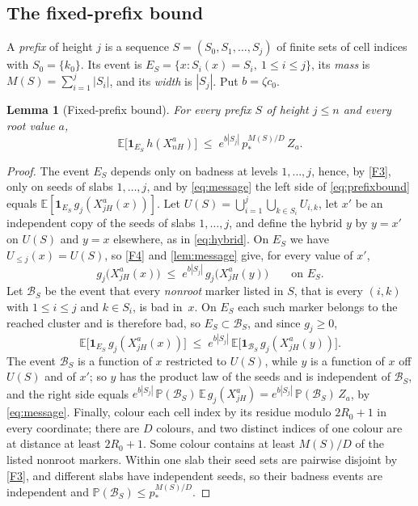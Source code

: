 \documentclass[11pt]{article}
\theoremstyle{plain}
\newtheorem{lemma}[theorem]{Lemma}
\theoremstyle{definition}
\theoremstyle{remark}
\newcommand{\E}{\mathbb{E}}
\newcommand{\Prob}{\mathbb{P}}
\begin{document}
\subsection{The fixed-prefix bound}

A \emph{prefix} of height $j$ is a sequence $S=(S_0,S_1,\dots,S_j)$ of finite sets of cell indices with $S_0=\{k_0\}$. Its event is $E_S=\{x:S_i(x)=S_i,\ 1\le i\le j\}$, its \emph{mass} is $M(S)=\sum_{i=1}^j|S_i|$, and its \emph{width} is $|S_j|$. Put $b=\zeta c_0$.

\begin{lemma}[Fixed-prefix bound]
\label{lem:prefix}
For every prefix $S$ of height $j\le n$ and every root value $a$,
\begin{equation}
\E\bigl[\mathbf 1_{E_S}\,h(X^a_{nH})\bigr]\;\le\;e^{b|S_j|}\,p_*^{M(S)/D}\,Z_a.
\label{eq:prefixbound}
\end{equation}
\end{lemma}

\begin{proof}
The event $E_S$ depends only on badness at levels $1,\dots,j$, hence, by \ref{F3}, only on seeds of slabs $1,\dots,j$, and by \eqref{eq:message} the left side of \eqref{eq:prefixbound} equals $\E[\mathbf 1_{E_S}\,g_j(X^a_{jH}(x))]$. Let $U(S)=\bigcup_{i=1}^j\bigcup_{k\in S_i}U_{i,k}$, let $x'$ be an independent copy of the seeds of slabs $1,\dots,j$, and define the hybrid $y$ by $y=x'$ on $U(S)$ and $y=x$ elsewhere, as in \eqref{eq:hybrid}. On $E_S$ we have $U_{\le j}(x)=U(S)$, so \ref{F4} and \cref{lem:message} give, for every value of $x'$,
\[
g_j\bigl(X^a_{jH}(x)\bigr)\;\le\;e^{b|S_j|}\,g_j\bigl(X^a_{jH}(y)\bigr)\qquad\text{on }E_S.
\]
Let $\mathcal B_S$ be the event that every \emph{nonroot} marker listed in $S$, that is every $(i,k)$ with $1\le i\le j$ and $k\in S_i$, is bad in~$x$. On $E_S$ each such marker belongs to the reached cluster and is therefore bad, so $E_S\subset\mathcal B_S$, and since $g_j\ge0$,
\[
\E\bigl[\mathbf 1_{E_S}\,g_j(X^a_{jH}(x))\bigr]\;\le\;e^{b|S_j|}\,\E\bigl[\mathbf 1_{\mathcal B_S}\,g_j(X^a_{jH}(y))\bigr].
\]
The event $\mathcal B_S$ is a function of $x$ restricted to $U(S)$, while $y$ is a function of $x$ off $U(S)$ and of $x'$; so $y$ has the product law of the seeds and is independent of $\mathcal B_S$, and the right side equals $e^{b|S_j|}\,\Prob(\mathcal B_S)\,\E\,g_j(X^a_{jH})=e^{b|S_j|}\,\Prob(\mathcal B_S)\,Z_a$, by \eqref{eq:message}. Finally, colour each cell index by its residue modulo $2R_0+1$ in every coordinate; there are $D$ colours, and two distinct indices of one colour are at distance at least $2R_0+1$. Some colour contains at least $M(S)/D$ of the listed nonroot markers. Within one slab their seed sets are pairwise disjoint by \ref{F3}, and different slabs have independent seeds, so their badness events are independent and $\Prob(\mathcal B_S)\le p_*^{M(S)/D}$.
\end{proof}
\end{document}
